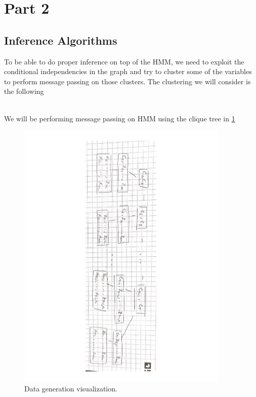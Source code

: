 \section{Part 2}

\subsection{Inference Algorithms}
To be able to do proper inference on top of the HMM, we need to exploit the conditional independencies in the graph and try to cluster some of the variables to perform message passing on those clusters. The clustering we will consider is the following\\
\hspace{1cm}\\

We will be performing message passing on HMM using the clique tree in \cref{fig:Clique Tree}
\begin{figure}
\centering
  \includegraphics[width=0.9\textwidth]{latex/figures/clique_tree.pdf}
  \caption{Data generation visualization.}
  \label{fig:Clique Tree}
\end{figure}

